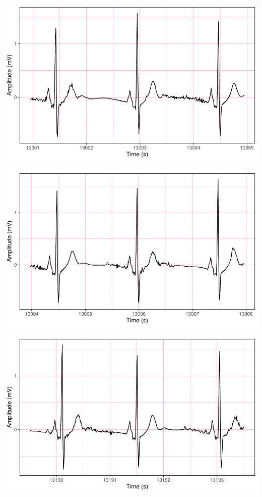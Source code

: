 \documentclass[
]{article}
\begin{document}
\begin{center}\includegraphics{report_files/figure-latex/abnormal-interval-15} \end{center}

\begin{center}\includegraphics{report_files/figure-latex/abnormal-interval-16} \end{center}

\begin{center}\includegraphics{report_files/figure-latex/abnormal-interval-17} \end{center}
\end{document}
